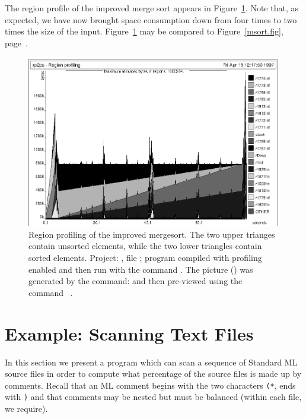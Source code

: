 \documentclass[12pt]{book}
\begin{document}
The region profile of the improved merge sort appears in 
Figure~\ref{msortreset.fig}. Note that, as expected, we have
now brought space consumption down from four times to two times the size of the
input. 
Figure~\ref{msortreset.fig}
may be compared to Figure~\ref{msort.fig}, page~\pageref{msort.fig}.

\begin{figure}
\begin{center}
\includegraphics{msortreset2.ps}
\end{center}
\caption{Region profiling of the improved mergesort. 
The two upper trianges contain unsorted elements, while the
two lower triangles contain sorted elements.
Project: ,
file ; program compiled with
profiling enabled and then run with the command
. The picture () 
was generated by the command: 
and then pre-viewed using the command ~.}
\label{msortreset.fig}
\end{figure}

\section{Example: Scanning Text Files}
In this section we present a program which can 
scan a sequence of Standard ML source
files in order to compute what percentage of the source files is made
up by comments. Recall that an ML comment begins with the two
characters {\tt (*}, ends with {\tt *)} and that comments may be
nested but must be balanced (within each file, we require).
\end{document}
